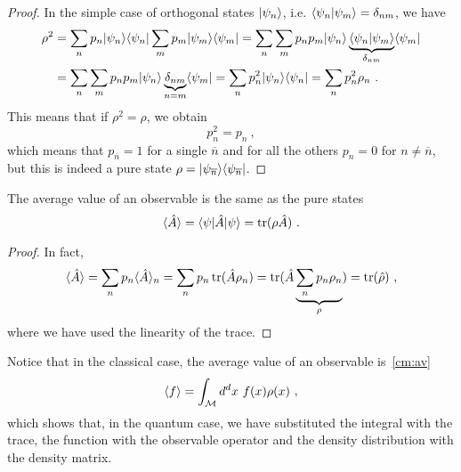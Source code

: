     \begin{proof}
        In the simple case of orthogonal states $\vert\psi_n\rangle$, i.e. $\langle\psi_n\vert\psi_m\rangle = \delta_{nm}$, we have 
        \begin{equation*}
        \begin{aligned}
            \rho^2 & = \sum_n p_n \vert\psi_n\rangle \langle\psi_n\vert \sum_m p_m \vert\psi_m\rangle \langle\psi_m\vert = \sum_n \sum_m p_n p_m \vert\psi_n\rangle \underbrace{\langle\psi_n\vert\psi_m\rangle}_{\delta_{nm}} \langle\psi_m\vert \\ & = \sum_n \sum_m p_n p_m \vert\psi_n\rangle \underbrace{\delta_{nm}}_{n=m} \langle\psi_m\vert = \sum_n p^2_n \vert\psi_n\rangle \langle\psi_n\vert = \sum_n p^2_n \rho_n ~.
        \end{aligned}
        \end{equation*}
        This means that if $\rho^2 = \rho$, we obtain 
        \begin{equation*}
            p_n^2 = p_n ~,
        \end{equation*}
        which means that $p_{\overline n} = 1$ for a single $\overline n$ and for all the others $p_n = 0$ for $n \neq \overline n$, but this is indeed a pure state $\rho = \vert\psi_{\overline n}\rangle \langle\psi_{\overline n}\vert$.
    \end{proof}
    The average value of an observable is the same as the pure states 
    \begin{equation}\label{avobs}
        \langle\hat A\rangle = \langle\psi\vert \hat A \vert\psi\rangle = \operatorname{tr} (\rho \hat A) ~.
    \end{equation}
    \begin{proof}
        In fact, 
        \begin{equation*}
            \langle\hat A\rangle = \sum_n p_n \langle\hat A\rangle_n = \sum_n p_n \operatorname{tr}(\hat A \rho_n) = \operatorname{tr} (\hat A \underbrace{\sum_n p_n \rho_n}_\rho) = \operatorname{tr} (\hat \rho) ~,
        \end{equation*}
        where we have used the linearity of the trace.
    \end{proof}

    Notice that in the classical case, the average value of an observable is~\eqref{cm:av}
    \begin{equation*}
        \langle f\rangle = \int_{\mathcal M} d^d x ~ f(x) \rho(x) ~,
    \end{equation*}
    which shows that, in the quantum case, we have substituted the integral with the trace, the function with the observable operator and the density distribution with the density matrix.

